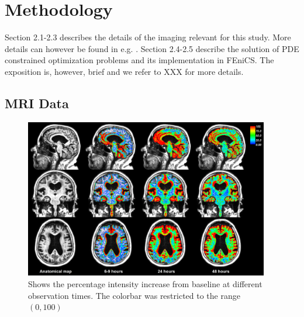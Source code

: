 \documentclass[11pt,a4paper]{article}
\begin{document}
\section{Methodology}

Section 2.1-2.3 describes the details of the imaging relevant for this study. More details can however be
found in e.g. \cite{ringstad2018brain}. Section 2.4-2.5 describe the solution of PDE constrained optimization problems and
its implementation in FEniCS. The exposition is, however, brief and we refer to XXX for more details. 







\subsection{MRI Data}
\begin{figure}
\includegraphics[width=0.95\textwidth]{PatID-68-new-100.png} 
\caption{Shows the percentage intensity increase from baseline at different observation times. The colorbar was restricted to the range $(0,100)$ }
\label{fig1} 
\end{figure}
\end{document}
